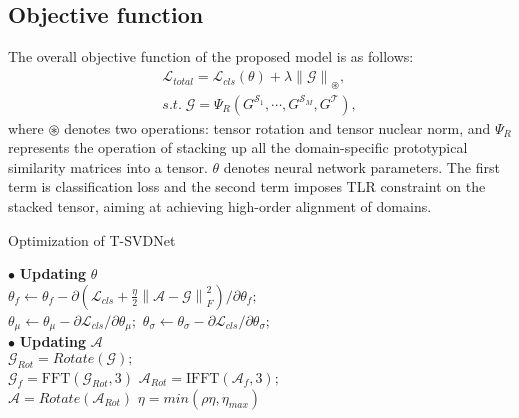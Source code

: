 \documentclass[10pt,twocolumn,letterpaper]{article}
\begin{document}
\subsection{Objective function}
\label{sec3.4}
The overall objective function of the proposed model is as follows:
\begin{equation}\label{eq10}
	\begin{split}
		\mathcal{L}_{total} =\mathcal{L}_{cls}({\theta})+ \lambda\left \| \mathcal{G} \right \|_\circledast,\\
		s.t.\;\mathcal{G}=\Psi_R(G^{\mathcal{S}_1}, \cdots, G^{\mathcal{S}_M}, G^{\mathcal{T}}),
	\end{split}
\end{equation}
where $\circledast$ denotes two operations: tensor rotation and tensor nuclear norm, and $\Psi_R$ represents the operation of stacking up all the domain-specific prototypical similarity matrices into a tensor. $\theta$ denotes neural network parameters.
The first term is classification loss and the second term imposes TLR constraint on the stacked tensor, aiming at achieving high-order alignment of domains. \par
{\tiny \begin{algorithm}[!t]
	\caption{Optimization of T-SVDNet}\label{alg2}
	{	$\bullet$ \textbf{Updating} $\theta$\\
		{$\theta_f \leftarrow \theta_f - {\partial (\mathcal{L}_{cls}+\frac{\eta}{2}\left \| \mathcal{A}-\mathcal{G} \right \|_{F}^{2})}/{\partial \theta_f}; $ }\\
		$\theta_{\mu} \leftarrow \theta_{\mu} -{\partial \mathcal{L}_{cls}}/{\partial \theta_{\mu}};$ $\theta_{\sigma} \leftarrow \theta_{\sigma} -{\partial \mathcal{L}_{cls}}/{\partial \theta_{\sigma}};$\\
		$\bullet$ \textbf{Updating} $\mathcal{A}$\\
		$\mathcal{G}_{Rot}=Rotate(\mathcal{G});$ \\
		$\mathcal{G}_f = \text{FFT}(\mathcal{G}_{Rot},3)$\;
		$\mathcal{A}_{Rot} = \text{IFFT}(\mathcal{A}_f, 3);$ \\
		$\mathcal{A} = Rotate(\mathcal{A}_{Rot})$ \;
		$\eta = min(\rho\eta, \eta_{max})$
	}
\end{algorithm}}
\end{document}
